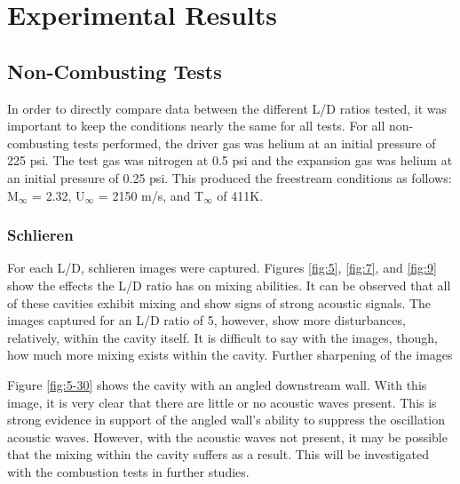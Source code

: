 
\chapter{Experimental Results} %

\label{Chapter4} %



\section{Non-Combusting Tests}

In order to directly compare data between the different L/D ratios tested, it was important to keep the conditions nearly the same for all tests. For all non-combusting tests performed, the driver gas was helium at an initial pressure of 225 psi. The test gas was nitrogen at 0.5 psi and the expansion gas was helium at an initial pressure of 0.25 psi. This produced the freestream conditions as follows: M$_\infty$ = 2.32, U$_\infty$ = 2150 m/s, and T$_\infty$ of 411K. 

\subsection{Schlieren}

For each L/D, schlieren images were captured. Figures \ref{fig:5}, \ref{fig:7}, and \ref{fig:9} show the effects the L/D ratio has on mixing abilities. It can be observed that all of these cavities exhibit mixing and show signs of strong acoustic signals. The images captured for an L/D ratio of 5, however, show more disturbances, relatively, within the cavity itself. It is difficult to say with the images, though, how much more mixing exists within the cavity. Further sharpening of the images

Figure \ref{fig:5-30} shows the cavity with an angled downstream wall. With this image, it is very clear that there are little or no acoustic waves present. This is strong evidence in support of the angled wall's ability to suppress the oscillation acoustic waves. However, with the acoustic waves not present, it may be possible that the mixing within the cavity suffers as a result. This will be investigated with the combustion tests in further studies. 

